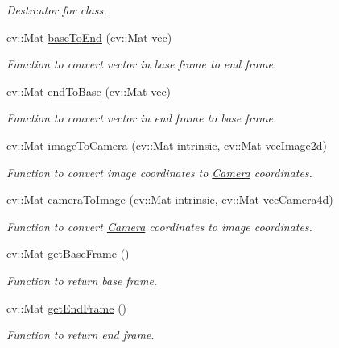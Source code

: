 \begin{DoxyCompactItemize}
\begin{DoxyCompactList}\small\item\em Destrcutor for class. \end{DoxyCompactList}\item 
cv\+::\+Mat \hyperlink{classTransformation_afcce8d7bce0b4760e90b2c9a4f33778b}{base\+To\+End} (cv\+::\+Mat vec)
\begin{DoxyCompactList}\small\item\em Function to convert vector in base frame to end frame. \end{DoxyCompactList}\item 
cv\+::\+Mat \hyperlink{classTransformation_ae06ef579b76564a33e5db35f7d617161}{end\+To\+Base} (cv\+::\+Mat vec)
\begin{DoxyCompactList}\small\item\em Function to convert vector in end frame to base frame. \end{DoxyCompactList}\item 
cv\+::\+Mat \hyperlink{classTransformation_a8a7c06d699c43a020069098aac504e27}{image\+To\+Camera} (cv\+::\+Mat intrinsic, cv\+::\+Mat vec\+Image2d)
\begin{DoxyCompactList}\small\item\em Function to convert image coordinates to \hyperlink{classCamera}{Camera} coordinates. \end{DoxyCompactList}\item 
cv\+::\+Mat \hyperlink{classTransformation_a9e7afec78535b499d99c8d55e08f91f1}{camera\+To\+Image} (cv\+::\+Mat intrinsic, cv\+::\+Mat vec\+Camera4d)
\begin{DoxyCompactList}\small\item\em Function to convert \hyperlink{classCamera}{Camera} coordinates to image coordinates. \end{DoxyCompactList}\item 
cv\+::\+Mat \hyperlink{classTransformation_a0536abd126af1fcffd0b7644ebf0b108}{get\+Base\+Frame} ()
\begin{DoxyCompactList}\small\item\em Function to return base frame. \end{DoxyCompactList}\item 
cv\+::\+Mat \hyperlink{classTransformation_aea3e04cbe0289fcd34b51c6541a23242}{get\+End\+Frame} ()
\begin{DoxyCompactList}\small\item\em Function to return end frame. \end{DoxyCompactList}\end{DoxyCompactItemize}


